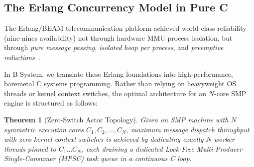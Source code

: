 \documentclass[10pt,journal,compsoc,twocolumn]{article}
\newtheorem{theorem}{Theorem}
\begin{document}
\subsection{The Erlang Concurrency Model in Pure C}
The Erlang/BEAM telecommunication platform achieved world-class reliability (nine-nines availability) not through hardware MMU process isolation, but through \emph{pure message passing}, \emph{isolated heap per process}, and \emph{preemptive reductions}~\cite{armstrong2003erlang}.

In B-System, we translate these Erlang foundations into high-performance, baremetal C systems programming. Rather than relying on heavyweight OS threads or kernel context switches, the optimal architecture for an $N$-core SMP engine is structured as follows:

\begin{theorem}[Zero-Switch Actor Topology]
\label{thm:actor_topology}
Given an SMP machine with $N$ symmetric execution cores $C_1, C_2, \dots, C_N$, maximum message dispatch throughput with zero kernel context switches is achieved by dedicating exactly $N$ worker threads pinned to $C_1 \dots C_N$, each draining a dedicated Lock-Free Multi-Producer Single-Consumer (MPSC) task queue in a continuous C loop.
\end{theorem}
\end{document}
